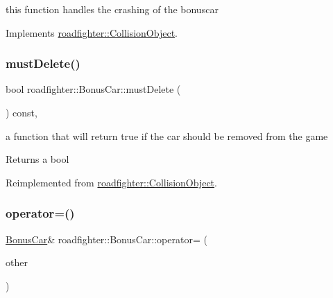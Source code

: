 this function handles the crashing of the bonuscar 

Implements \hyperlink{classroadfighter_1_1CollisionObject_a18f0f60a5a664d6fb554daac0d398a2c}{roadfighter\+::\+Collision\+Object}.

\mbox{\label{classroadfighter_1_1BonusCar_a19d01e92134634a82ae53f0d017956aa}} 
\subsubsection{\texorpdfstring{must\+Delete()}{mustDelete()}}
{\footnotesize\ttfamily bool roadfighter\+::\+Bonus\+Car\+::must\+Delete (\begin{DoxyParamCaption}{ }\end{DoxyParamCaption}) const\hspace{0.3cm}{\ttfamily [override]}, {\ttfamily [virtual]}}

a function that will return true if the car should be removed from the game \begin{DoxyReturn}{Returns}
a bool 
\end{DoxyReturn}


Reimplemented from \hyperlink{classroadfighter_1_1CollisionObject_a738071cd7b1b8cd4c8d455b5e552bd4c}{roadfighter\+::\+Collision\+Object}.

\mbox{\label{classroadfighter_1_1BonusCar_acd5303a50571433116089c1f63ab0a9e}} 
\subsubsection{\texorpdfstring{operator=()}{operator=()}\hspace{0.1cm}{\footnotesize\ttfamily [1/2]}}
{\footnotesize\ttfamily \hyperlink{classroadfighter_1_1BonusCar}{Bonus\+Car}\& roadfighter\+::\+Bonus\+Car\+::operator= (\begin{DoxyParamCaption}\item[{const \hyperlink{classroadfighter_1_1BonusCar}{Bonus\+Car} \&}]{other }\end{DoxyParamCaption})\hspace{0.3cm}{\ttfamily [default]}}

